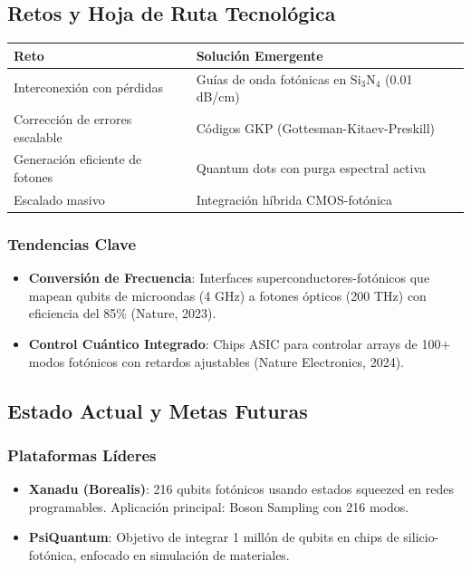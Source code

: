 \documentclass{article}
\begin{document}
\subsection*{Retos y Hoja de Ruta Tecnológica}

\begin{table}[h]
\centering
\small
\begin{tabular}{|l|l|}
\hline
\textbf{Reto} & \textbf{Solución Emergente} \\
\hline
Interconexión con pérdidas & Guías de onda fotónicas en $\text{Si}_3\text{N}_4$ (0.01 dB/cm) \\
Corrección de errores escalable & Códigos GKP (Gottesman-Kitaev-Preskill) \\
Generación eficiente de fotones & Quantum dots con purga espectral activa \\
Escalado masivo & Integración híbrida CMOS-fotónica \\
\hline
\end{tabular}
\end{table}

\subsubsection*{Tendencias Clave}

\begin{itemize}
    \item \textbf{Conversión de Frecuencia}: Interfaces superconductores-fotónicos que mapean qubits de microondas (4 GHz) a fotones ópticos (200 THz) con eficiencia del 85\% (Nature, 2023).
    \item \textbf{Control Cuántico Integrado}: Chips ASIC para controlar arrays de 100+ modos fotónicos con retardos ajustables (Nature Electronics, 2024).
\end{itemize}

\subsection*{Estado Actual y Metas Futuras}

\subsubsection*{Plataformas Líderes}

\begin{itemize}
    \item \textbf{Xanadu (Borealis)}: 216 qubits fotónicos usando estados squeezed en redes programables. Aplicación principal: Boson Sampling con 216 modos.
    \item \textbf{PsiQuantum}: Objetivo de integrar 1 millón de qubits en chips de silicio-fotónica, enfocado en simulación de materiales.
\end{itemize}
\end{document}
